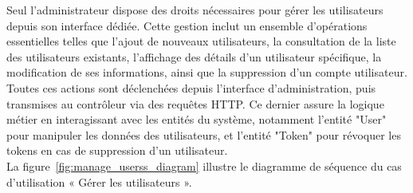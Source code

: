 Seul l’administrateur dispose des droits nécessaires pour gérer les utilisateurs depuis son interface dédiée. Cette gestion inclut un ensemble d’opérations essentielles telles que l’ajout de nouveaux utilisateurs, la consultation de la liste des utilisateurs existants, l’affichage des détails d’un utilisateur spécifique, la modification de ses informations, ainsi que la suppression d’un compte utilisateur. Toutes ces actions sont déclenchées depuis l’interface d’administration, puis transmises au contrôleur via des requêtes HTTP. Ce dernier assure la logique métier en interagissant avec les entités du système, notamment l’entité "User" pour manipuler les données des utilisateurs, et l’entité "Token" pour révoquer les tokens en cas de suppression d'un utilisateur. \\
La figure~\ref{fig:manage_userss_diagram} illustre le diagramme de séquence du cas d'utilisation « Gérer les utilisateurs ».
\newpage
\vspace*{-3cm} 
